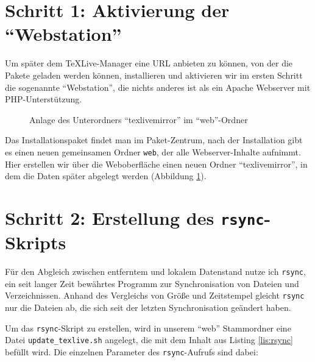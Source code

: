 \documentclass{dtk}
\begin{document}
\section{Schritt 1: Aktivierung der \enquote{Webstation}}

Um später dem \TeX Live-Manager eine URL anbieten zu können, von der die Pakete geladen werden können, installieren und aktivieren wir im ersten Schritt die sogenannte \enquote{Webstation}, die nichts anderes ist als ein Apache Webserver mit PHP-Unterstützung.

\begin{figure}
\caption{Anlage des Unterordners \enquote{texlivemirror} im \enquote{web}-Ordner}\label{fig:Ordner}
\end{figure}

Das Installationspaket findet man im Paket-Zentrum, nach der Installation gibt es einen neuen gemeinsamen Ordner \texttt{web}, der alle Webserver-Inhalte aufnimmt. Hier erstellen wir über die Weboberfläche einen neuen Ordner \enquote{texlivemirror}, in dem die Daten später abgelegt werden (Abbildung \ref{fig:Ordner}).

\section{Schritt 2: Erstellung des \texttt{rsync}-Skripts}

Für den Abgleich zwischen entferntem und lokalem Datenstand nutze ich \texttt{rsync}, ein seit langer Zeit bewährtes Programm zur Synchronisation von Dateien und Verzeichnissen. Anhand des Vergleichs von Größe und Zeitstempel gleicht \texttt{rsync} nur die Dateien ab, die sich seit der letzten Synchronisation geändert haben.

Um das \texttt{rsync}-Skript zu erstellen, wird in unserem \enquote{web} Stammordner eine Datei \verb|update_texlive.sh| angelegt, die mit dem Inhalt aus Listing \ref{lis:rsync} befüllt wird. Die einzelnen Parameter des \texttt{rsync}-Aufrufs sind dabei:
\end{document}
